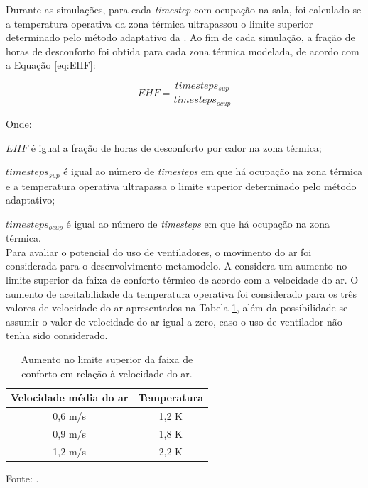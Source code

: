 \documentclass[brazil,hardcopy,openany,a5paper]{ufscthesis}
\begin{document}
		Durante as simulações, para cada \textit{timestep} com ocupação na sala, foi calculado se a temperatura operativa da zona térmica ultrapassou o limite superior determinado pelo método adaptativo da  \cite{ASHRAEStandard552017}. Ao fim de cada simulação, a fração de horas de desconforto foi obtida para cada zona térmica modelada, de acordo com a Equação \ref{eq:EHF}:
		
		\begin{equation}
		\label{eq:EHF}
		EHF = \frac{timesteps_{sup}}{timesteps_{ocup}}
		\end{equation}
		
		Onde:
		
		$EHF$ é igual a fração de horas de desconforto por calor na zona térmica;
		
		$timesteps_{sup}$ é igual ao número de \textit{timesteps} em que há ocupação na zona térmica e a temperatura operativa ultrapassa o limite superior determinado pelo método adaptativo;
		
		$timesteps_{ocup}$ é igual ao número de \textit{timesteps} em que há ocupação na zona térmica.
		\\
		
		Para avaliar o potencial do uso de ventiladores, o movimento do ar foi considerada para o desenvolvimento metamodelo.
		A  \cite{ASHRAEStandard552017} considera um aumento no limite superior da faixa de conforto térmico de acordo com a velocidade do ar.
		O aumento de aceitabilidade da temperatura operativa foi considerado para os três valores de velocidade do ar apresentados na Tabela \ref{table:var}, além da possibilidade se assumir o valor de velocidade do ar igual a zero, caso o uso de ventilador não tenha sido considerado.
		
		\begin{table}[h]
			\centering
			\caption{Aumento no limite superior da faixa de conforto em relação à velocidade do ar.}
			\label{table:var}
			\begin{tabular}{|c |c |}
				\hline
				\textbf{Velocidade média do ar} & \textbf{Temperatura} \\
				\hline
				0,6 m/s & 1,2 K \\
				\hline
				0,9 m/s & 1,8 K \\
				\hline
				1,2 m/s & 2,2 K \\
				\hline 
			\end{tabular}
			\begin{flushleft}
				Fonte:   \cite{ASHRAEStandard552017}.
			\end{flushleft}				
		\end{table}
	
\end{document}
